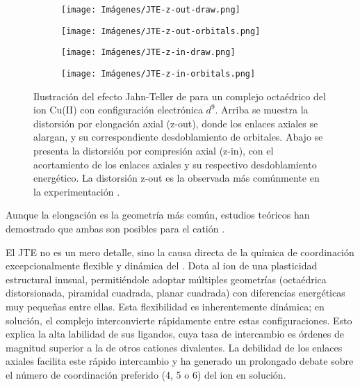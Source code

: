 \begin{figure}[H]
    \centering
    
    \begin{subfigure}{0.2\textwidth}
        \centering
        \texttt{[image: Imágenes/JTE-z-out-draw.png]}
        \caption{}
    \end{subfigure}
    \begin{subfigure}{0.2\textwidth}
        \centering
        \texttt{[image: Imágenes/JTE-z-out-orbitals.png]}
        \caption{}
    \end{subfigure}
    
    \vspace{0.5cm} %
    
    \begin{subfigure}{0.3\textwidth}
        \centering
        \texttt{[image: Imágenes/JTE-z-in-draw.png]}
        \caption{}
    \end{subfigure}
    \begin{subfigure}{0.2\textwidth}
        \centering
        \texttt{[image: Imágenes/JTE-z-in-orbitals.png]}
        \caption{}
    \end{subfigure}
    
    \caption{Ilustración  del efecto Jahn-Teller de \cite{Cu-2019-01} para un complejo octaédrico del ion Cu(II) con configuración electrónica $d^9$. Arriba se muestra la distorsión por elongación axial (z-out), donde los enlaces axiales se alargan, y su correspondiente desdoblamiento de orbitales. Abajo se presenta la distorsión por compresión axial (z-in), con el acortamiento de los enlaces axiales y su respectivo desdoblamiento energético. La distorsión z-out es la observada más comúnmente en la experimentación .}
    \label{fig:jahn_teller_cu2}
\end{figure}


Aunque la elongación es la geometría más común, estudios teóricos han demostrado que ambas son posibles para el catión  \cite{Cu-2019-01}.

El JTE no es un mero detalle, sino la causa directa de la química de coordinación excepcionalmente flexible y dinámica del . Dota al ion de una plasticidad estructural inusual, permitiéndole adoptar múltiples geometrías (octaédrica distorsionada, piramidal cuadrada, planar cuadrada) con diferencias energéticas muy pequeñas entre ellas. Esta flexibilidad es inherentemente dinámica; en solución, el complejo interconvierte rápidamente entre estas configuraciones. Esto explica la alta labilidad de sus ligandos, cuya tasa de intercambio es órdenes de magnitud superior a la de otros cationes divalentes. La debilidad de los enlaces axiales facilita este rápido intercambio y ha generado un prolongado debate sobre el número de coordinación preferido (4, 5 o 6) del ion en solución.

